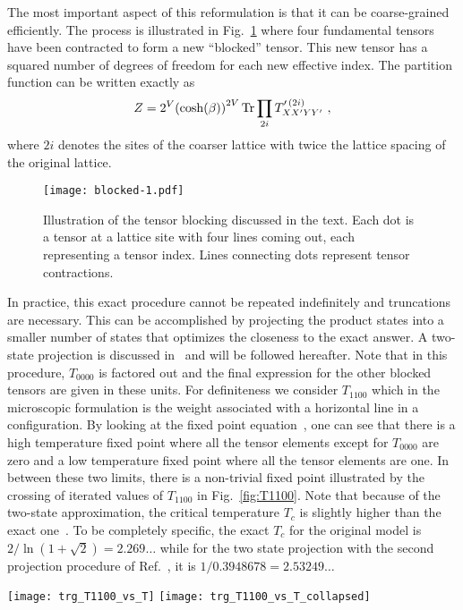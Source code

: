 \documentclass[../main.tex]{subfiles}
\begin{document}
The most important aspect of this reformulation is that it can be
coarse-grained efficiently.
%
The process is illustrated in Fig.~\ref{fig:unit_block} where four fundamental
tensors have been contracted to form a new ``blocked'' tensor.  This new tensor
has a squared number of degrees of freedom for each new effective index. The
partition function can be written exactly as 
%
\begin{equation*}
  Z= 2^V{(\cosh (\beta))}^{2V}\operatorname{Tr}\prod_{2i}T^{\prime\,
    (2i)}_{XX^{\prime}YY^{\prime}} \ , 
\label{eq:ZP}
\end{equation*}
%
where $2i$ denotes the sites of the coarser lattice with twice the lattice
spacing of the original lattice. 
%
\begin{figure}[htpb]
    \centering
    \texttt{[image: blocked-1.pdf]}
    \caption{Illustration of the tensor blocking discussed in the text.  Each
      dot is a tensor at a lattice site with four lines coming out, each
      representing a tensor index.  Lines connecting dots represent tensor
    contractions.}%
\label{fig:unit_block}
\end{figure}
%
In practice, this exact procedure cannot be repeated indefinitely and
truncations are necessary.
%
This can be accomplished by projecting the product states into a smaller number
of states that optimizes the closeness to the exact answer.
%
A two-state projection is discussed in~\cite{prb87} and will be followed
hereafter.
%
Note that in this procedure, $T_{0000}$ is factored out and the final
expression for the other blocked tensors are given in these units.
%
For definiteness we consider $T_{1100}$ which in the microscopic formulation is
the weight associated with a horizontal line in a \lc configuration.
%
By looking at the fixed point equation~\cite{prb87}, one can see that there is
a high temperature fixed point where all the tensor elements except for
$T_{0000}$ are zero and a low temperature fixed point where all the tensor
elements are one.
%
In between these two limits, there is a non-trivial fixed point illustrated by
the crossing of iterated values of $T_{1100}$ in Fig.~\ref{fig:T1100}. Note
that because of the two-state approximation, the critical temperature $T_c$ is
slightly higher than the exact one~\cite{prb87}.
%
To be completely specific, the exact $T_c$ for the original model is
$2/\ln(1+\sqrt{2})=2.269\ldots$ while for the two state projection with the
second projection procedure of Ref.~\cite{prb87}, it is $1/0.3948678
=2.53249\ldots$
%
\begin{figure*}[htpb]
	\centering 
	 \texttt{[image: trg\_T1100\_vs\_T]}
	 \texttt{[image: trg\_T1100\_vs\_T\_collapsed]}
	 \caption{(a) $T_{1100}$ vs. $T - T_c^{(2s)}$ for six successive iterations
		 of the blocking transformation, beginning with an initial lattice $L =
		 64$; (b) $T_{1100}$ vs. $(T - T_{c}^{(2s)}) / L_{\mathrm{eff}}$
		 illustrating the data collapse, where $T_{c}^{(2s)}$ is the critical
		 temperature of the two state projection, beginning at iteration 0 on an
		 $L = 64$ lattice.}%
\label{fig:T1100}
\end{figure*}
\end{document}
